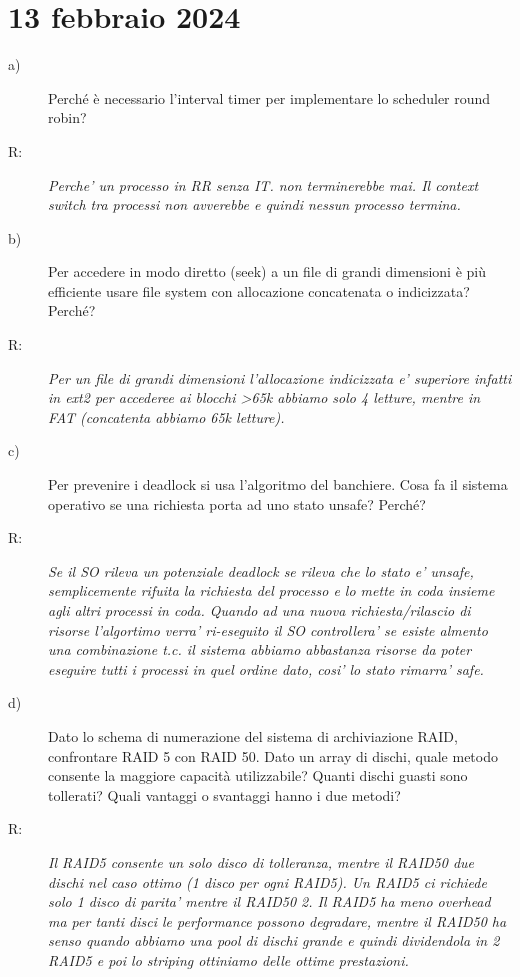 \documentclass[a4paper,12pt]{article}
\newcommand{\datasection}[1]{%
    \section*{#1}%
    \addcontentsline{toc}{section}{#1}%
}
\newenvironment{exambox}{%
    \begin{mdframed}[
        linecolor=black!70,
        linewidth=0.6pt,
        innerleftmargin=8pt,
        innerrightmargin=8pt,
        innertopmargin=6pt,
        innerbottommargin=6pt
    ]
    \begin{description}
}{%
    \end{description}
    \end{mdframed}
}
\begin{document}
\newpage
\datasection{13 febbraio 2024}
\begin{exambox}
\item[a)] Perché è necessario l'interval timer per implementare lo scheduler round robin?
\item[R:] \textit{Perche' un processo in RR senza IT. non terminerebbe mai. Il context switch tra processi non avverebbe e quindi nessun processo termina.}
\item[b)] Per accedere in modo diretto (seek) a un file di grandi dimensioni è più efficiente usare file system con allocazione concatenata o indicizzata? Perché?
\item[R:] \textit{Per un file di grandi dimensioni l'allocazione indicizzata e' superiore infatti in ext2 per accederee ai blocchi >65k abbiamo solo 4 letture, mentre in FAT (concatenta abbiamo 65k letture).}
\item[c)] Per prevenire i deadlock si usa l'algoritmo del banchiere. Cosa fa il sistema operativo se una richiesta porta ad uno stato unsafe? Perché?
\item[R:] \textit{Se il SO rileva un potenziale deadlock se rileva che lo stato e' unsafe, semplicemente rifuita la richiesta del processo e lo mette in coda insieme agli altri processi in coda. Quando ad una nuova richiesta/rilascio di risorse l'algortimo verra' ri-eseguito il SO controllera' se esiste almento una combinazione t.c. il sistema abbiamo abbastanza risorse da poter eseguire tutti i processi in quel ordine dato, cosi' lo stato rimarra' safe.}
\item[d)] Dato lo schema di numerazione del sistema di archiviazione RAID, confrontare RAID 5 con RAID 50. Dato un array di dischi, quale metodo consente la maggiore capacità utilizzabile? Quanti dischi guasti sono tollerati? Quali vantaggi o svantaggi hanno i due metodi?
\item[R:] \textit{Il RAID5 consente un solo disco di tolleranza, mentre il RAID50 due dischi nel caso ottimo (1 disco per ogni RAID5). Un RAID5 ci richiede solo 1 disco di parita' mentre il RAID50 2. Il RAID5 ha meno overhead ma per tanti disci le performance possono degradare, mentre il RAID50 ha senso quando abbiamo una pool di dischi grande e quindi dividendola in 2 RAID5 e poi lo striping ottiniamo delle ottime prestazioni.}
\end{exambox}
\end{document}
